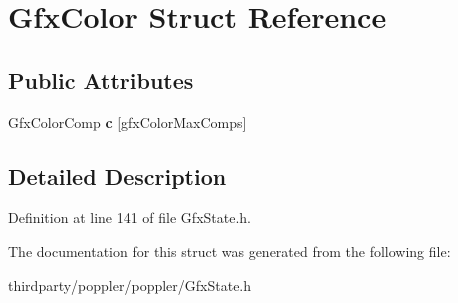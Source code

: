 \hypertarget{struct_gfx_color}{}\section{Gfx\+Color Struct Reference}
\label{struct_gfx_color}
\subsection*{Public Attributes}
\begin{DoxyCompactItemize}
\item 
\mbox{\label{struct_gfx_color_a90af01bc6022fd9732da529e14204569}} 
Gfx\+Color\+Comp {\bfseries c} \mbox{[}gfx\+Color\+Max\+Comps\mbox{]}
\end{DoxyCompactItemize}


\subsection{Detailed Description}


Definition at line 141 of file Gfx\+State.\+h.



The documentation for this struct was generated from the following file\+:\begin{DoxyCompactItemize}
\item 
thirdparty/poppler/poppler/Gfx\+State.\+h\end{DoxyCompactItemize}
